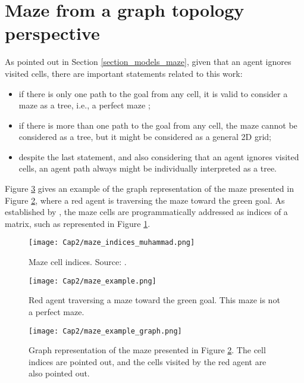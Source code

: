 \section{Maze from a graph topology perspective}
\label{section_models_maze_graph}
As pointed out in Section \ref{section_models_maze}, given that an agent ignores visited cells, there are important statements related to this work:

\begin{itemize}
\item if there is only one path to the goal from any cell, it is valid to consider a maze as a tree, i.e., a perfect maze \cite{Muhammad2021};

\item if there is more than one path to the goal from any cell, the maze cannot be considered as a tree, but it might be considered as a general 2D grid;

\item despite the last statement, and also considering that an agent ignores visited cells, an agent path always might be individually interpreted as a tree.
\end{itemize}

Figure \ref{maze_example_graph} gives an example of the graph representation of the maze presented in Figure \ref{maze_example}, where a red agent is traversing the maze toward the green goal. As established by , the maze cells are programmatically addressed as indices of a matrix, such as represented in Figure \ref{maze_indices_muhammad}.

\begin{figure}[ht!]
\centering
\texttt{[image: Cap2/maze\_indices\_muhammad.png]}
\caption{Maze cell indices. Source: .}
\label{maze_indices_muhammad}
\end{figure}

\begin{figure}[ht!]
\centering
\texttt{[image: Cap2/maze\_example.png]}
\caption{Red agent traversing a maze toward the green goal. This maze is not a perfect maze.}
\label{maze_example}
\end{figure}

\begin{figure}[ht!]
\centering
\texttt{[image: Cap2/maze\_example\_graph.png]}
\caption{Graph representation of the maze presented in Figure \ref{maze_example}. The cell indices are pointed out, and the cells visited by the red agent are also pointed out.}
\label{maze_example_graph}
\end{figure}	

